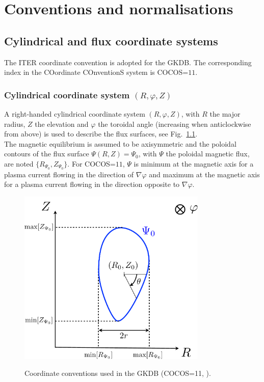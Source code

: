 \documentclass[a4paper]{report}
\begin{document}
\chapter{Conventions and normalisations}
\label{chap:normdef}
\section{Cylindrical and flux coordinate systems}
The ITER coordinate convention is adopted for the GKDB. The corresponding index in the COordinate COnventionS system  \cite{Sauter:CPC2013} is COCOS=$11$.
\subsection{Cylindrical coordinate system $(R,\varphi,Z)$}
A right-handed cylindrical coordinate system $(R,\varphi,Z)$, with $R$ the major radius, $Z$ the elevation and $\varphi$ the toroidal angle (increasing when anticlockwise from above) is used to describe the flux surfaces, see Fig.~\ref{fig:coord1}. \\
The magnetic equilibrium is assumed to be axisymmetric and the poloidal contours of the flux surface $\Psi(R,Z)=\Psi_0$, with $\Psi$ the poloidal magnetic flux, are noted $\{R_{\Psi_0},Z_{\Psi_0}\}$.
For COCOS=$11$, $\Psi$ is minimum at the magnetic axis for a plasma current flowing in the direction of $\nabla \varphi$ and maximum at the magnetic axis for a plasma current flowing in the direction opposite to $\nabla \varphi$.
\begin{figure}[h]
\begin{center}
  \includegraphics[width=9cm]{COCOS.pdf}\\
  \caption{\label{fig:coord1} Coordinate conventions used in the GKDB (COCOS=11, \cite{Sauter:CPC2013}).}
\end{center}
\end{figure}
\end{document}
